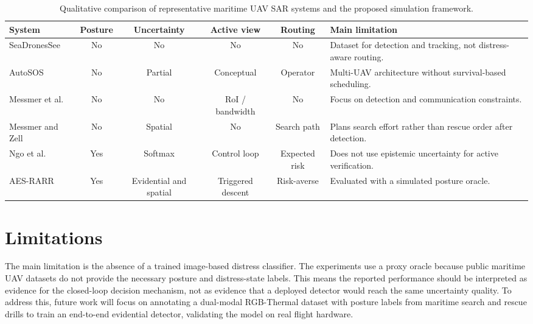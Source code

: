 \documentclass[runningheads]{llncs}
\newcommand{\aes}{AES-RARR}
\begin{document}
\begin{table}[p]
\centering
\caption{Qualitative comparison of representative maritime UAV SAR systems and the proposed simulation framework.}
\label{tab:comparison}
\scriptsize
\setlength{\tabcolsep}{2.5pt}
\renewcommand{\arraystretch}{1.05}
\begin{tabularx}{\textwidth}{p{2.15cm}CCCCY}
\toprule
\textbf{System} & \textbf{Posture} & \textbf{Uncertainty} & \textbf{Active view} & \textbf{Routing} & \textbf{Main limitation} \\
\midrule
SeaDronesSee \cite{varga2022seadronessee} & No & No & No & No & Dataset for detection and tracking, not distress-aware routing. \\
AutoSOS \cite{queralta2020} & No & Partial & Conceptual & Operator & Multi-UAV architecture without survival-based scheduling. \\
Messmer et al. \cite{messmer2024holistic} & No & No & RoI / bandwidth & No & Focus on detection and communication constraints. \\
Messmer and Zell \cite{messmer2024planning} & No & Spatial & No & Search path & Plans search effort rather than rescue order after detection. \\
Ngo et al. \cite{ngo2026drowning} & Yes & Softmax & Control loop & Expected risk & Does not use epistemic uncertainty for active verification. \\
\aes{} & Yes & Evidential and spatial & Triggered descent & Risk-averse & Evaluated with a simulated posture oracle. \\
\bottomrule
\end{tabularx}
\end{table}

\section{Limitations}

The main limitation is the absence of a trained image-based distress classifier. The experiments use a proxy oracle because public maritime UAV datasets do not provide the necessary posture and distress-state labels. This means the reported performance should be interpreted as evidence for the closed-loop decision mechanism, not as evidence that a deployed detector would reach the same uncertainty quality. To address this, future work will focus on annotating a dual-modal RGB-Thermal dataset with posture labels from maritime search and rescue drills to train an end-to-end evidential detector, validating the model on real flight hardware.
\end{document}
